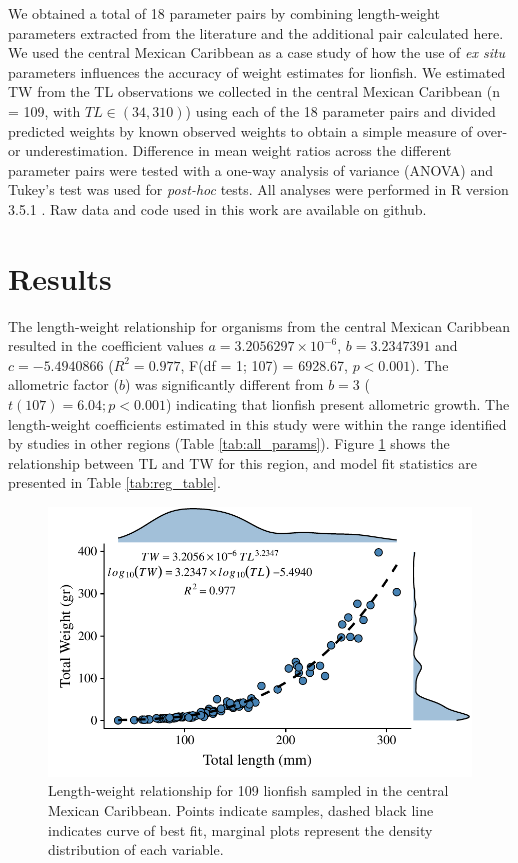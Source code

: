 \documentclass[fleqn,10pt,lineno]{wlpeerj} %
\begin{document}
We obtained a total of 18 parameter pairs by combining length-weight
parameters extracted from the literature and the additional pair
calculated here. We used the central Mexican Caribbean as a case study
of how the use of \emph{ex situ} parameters influences the accuracy of
weight estimates for lionfish. We estimated TW from the TL observations
we collected in the central Mexican Caribbean (n = 109, with
\(TL \in (34, 310)\)) using each of the 18 parameter pairs and divided
predicted weights by known observed weights to obtain a simple measure
of over- or underestimation. Difference in mean weight ratios across the
different parameter pairs were tested with a one-way analysis of
variance (ANOVA) and Tukey's test was used for \emph{post-hoc} tests.
All analyses were performed in R version 3.5.1 \citep{rcore_2018}. Raw
data and code used in this work are available on github.

\section*{Results}

The length-weight relationship for organisms from the central Mexican
Caribbean resulted in the coefficient values
\(a = 3.2056297\times 10^{-6}\), \(b = 3.2347391\) and
\(c = -5.4940866\) (\(R^2 = 0.977\), F(df = 1; 107) = 6928.67,
\(p < 0.001\)). The allometric factor (\(b\)) was significantly
different from \(b = 3\) (\(t(107) = 6.04; p<0.001\)) indicating that
lionfish present allometric growth. The length-weight coefficients
estimated in this study were within the range identified by studies in
other regions (Table \ref{tab:all_params}). Figure \ref{fig:l-w-carib}
shows the relationship between TL and TW for this region, and model fit
statistics are presented in Table \ref{tab:reg_table}.

\begin{figure}
\centering
\includegraphics{Manuscript_files/figure-latex/unnamed-chunk-7-1.pdf}
\caption{\label{fig:l-w-carib}Length-weight relationship for 109
lionfish sampled in the central Mexican Caribbean. Points indicate
samples, dashed black line indicates curve of best fit, marginal plots
represent the density distribution of each variable.}
\end{figure}
\end{document}
